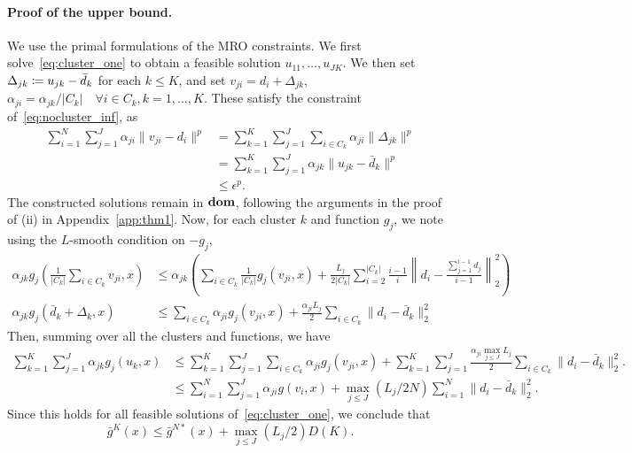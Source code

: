 \documentclass[12pt]{article}
\theoremstyle{thmstyleone}%
\theoremstyle{thmstyletwo}%
\theoremstyle{thmstylethree}%
\begin{document}
\begin{appendices}
{\paragraph{Proof of the upper bound.}
We use the primal formulations of the \gls{MRO} constraints. 
We first solve~\eqref{eq:cluster_one} to obtain a feasible solution $u_{11}, \dots, u_{JK}$. We then set $\Delta_{jk} \coloneqq u_{jk} - \bar{d}_k$ for each $k \leq K$, and set $v_{ji} = d_i + \Delta_{jk}$, $\alpha_{ji} = \alpha_{jk}/|C_k| \quad \forall i \in C_k, k = 1,\dots,K$.
These satisfy the constraint of~\eqref{eq:nocluster_inf}, as
\begin{align*}
	\sum_{i=1}^N \sum_{j=1}^J  \alpha_{ji} \| v_{ji} - d_i \|^p &= \sum_{k=1}^K \sum_{j=1}^J \sum_{i \in C_k}  \alpha_{ji} \|\Delta_{jk}\|^p\\
	&= \sum_{k=1}^K \sum_{j=1}^J \alpha_{jk} \|u_{jk} - \bar{d}_k\|^p\\
	&\leq \epsilon^p.
\end{align*}
The constructed solutions remain in $\mathop{\bf dom}$, following the arguments in the proof of (ii) in Appendix~\ref{app:thm1}. 
Now, for each cluster $k$ and function $g_j$, we note using the $L$-smooth condition on $-g_j$,
\begin{align*}
	\alpha_{jk} g_j\left(\frac{1}{|C_k|}\sum_{i \in C_k} v_{ji}, x\right) &\leq  \alpha_{jk} \left (\sum_{i \in C_k} \frac{1}{|C_k|} g_j(v_{ji},x) + \frac{L_j}{2|C_k|} \sum_{i=2} ^{|C_k|} \frac{i-1}{i} \left \|d_i - \frac{\sum_{j=1}^{i-1}d_j}{i-1} \right \|^2_2\right )\\
	\alpha_{jk} g_j(\bar{d}_k + \Delta_k,x) &\leq  \sum_{i \in C_k} \alpha_{ji} g_j(v_{ji},x)  + \frac{\alpha_{ji} L_j}{2} \sum_{i \in C_k} \|d_i - \bar{d}_k\|^2_2
\end{align*}
Then, summing over all the clusters and functions, we have 
\begin{align*}
\sum_{k=1}^K \sum_{j=1}^J \alpha_{jk}  g_j(u_k,x) &\leq \sum_{k=1}^K \sum_{j=1}^J \sum_{i \in C_k} \alpha_{ji} g_j(v_{ji},x)  + \sum_{k=1}^K \sum_{j=1}^J \frac{\alpha_{ji}  \max_{j\leq J} L_j}{2} \sum_{i \in C_k} \|d_i - \bar{d}_k\|^2_2.\\
&\leq \sum_{i=1}^N \sum_{j=1}^J \alpha_{ji} g(v_i,x) + \max_{j\leq J} (L_j/2N)\sum_{i=1}^N \|d_i - \bar{d}_k\|^2_2 .
\end{align*}
Since this holds for all feasible solutions of~\eqref{eq:cluster_one}, we conclude that 
$$ \bar{g}^K(x) \leq \bar{g}^{N*}(x) +  \max_{j\leq J} (L_j/2) D(K).$$
}


\end{appendices}
\end{document}
